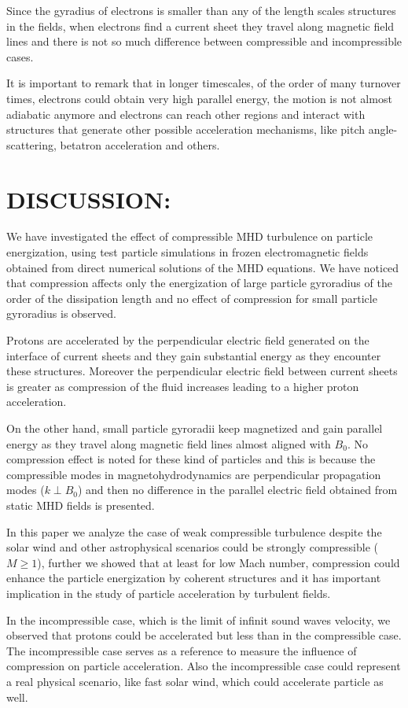 \documentclass[%
aip,pop,amsmath,amssymb,
 reprint,%
]{revtex4-1}
\begin{document}
Since the gyradius of electrons is smaller than any of the length
scales structures 
in the fields, when electrons find a current sheet they travel 
along magnetic
field lines and there is not so much 
difference between compressible and incompressible cases.

It is important to remark that in longer timescales, of the order 
of many turnover times, 
electrons could obtain very high parallel energy, the motion is not 
almost adiabatic anymore and electrons
can reach other regions and interact with 
structures that generate other possible acceleration mechanisms, like pitch 
angle-scattering, betatron acceleration and others.

\section{\label{sec:level4}DISCUSSION:}
We have investigated the effect of compressible MHD turbulence 
on particle energization,
using test particle simulations in frozen electromagnetic fields obtained 
from direct numerical solutions of the MHD
equations. We have noticed that compression affects only the energization 
of large particle
gyroradius of the order of the dissipation length and no effect 
of compression for
small particle gyroradius is observed. 

Protons are accelerated by the perpendicular electric field 
generated on the interface of
current sheets and they gain substantial energy as they encounter 
these structures. 
Moreover the perpendicular electric field between current sheets 
is greater as compression
of the fluid increases leading to a higher proton acceleration. 

On the other hand, small particle gyroradii keep magnetized 
and gain parallel energy as 
they travel along magnetic field lines almost aligned with $B_0$.
No compression effect is
noted for these kind of particles and this is because the compressible modes 
in 
magnetohydrodynamics are perpendicular propagation modes ($k \perp B_0$) 
and then no
difference in the parallel electric field obtained from static MHD fields is presented.

In this paper we analyze the case of weak compressible turbulence 
despite the solar wind
and other astrophysical scenarios could be strongly compressible ($M \geq 1$), 
further we
showed that at least for low Mach number, compression could enhance 
the particle
energization by coherent structures and it has important implication 
in the study of
particle acceleration by turbulent fields.

In the incompressible case, which is the limit of infinit sound waves 
velocity, we 
observed that protons could be accelerated but less than in the compressible 
case.
The incompressible case serves as a reference to measure the influence of
compression on particle 
acceleration. Also the incompressible case could represent 
a real physical scenario, like fast
solar wind, which could accelerate particle as well.

\nocite{*}

\end{document}
